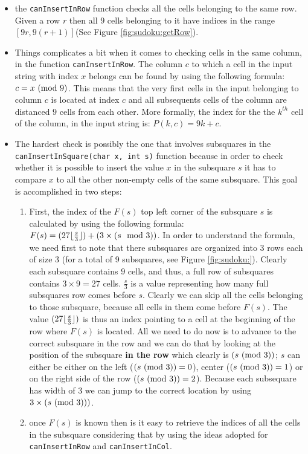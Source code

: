 \begin{itemize}
	\item the \lstinline[columns=fixed]{canInsertInRow} function checks all the cells belonging to
	the same row. Given a row $r$ then all $9$ cells belonging to it have indices in the range
	$[9r,9(r+1)]$(See Figure \ref{fig:sudoku:getRow}).
	\item Things complicates a bit when it comes to checking cells in the same column, in the
	function \lstinline[columns=fixed]{canInsertInRow}. The column $c$ to which a cell in the input
	string with index $x$ belongs can be found by using the following formula: $c = x \ (\mathrm{mod}\ 9)$. This
	means that the very first cells in the input belonging to column $c$ is located at index $c$ and
	all subsequents cells of the column are distanced $9$ cells from each other. More formally, the
	index for the the $k^{th}$ cell of the column, in the input string is: $P(k,c) = 9k+c$.
	\item The hardest check is possibly the one that involves subsquares in the
	\lstinline[columns=fixed]{canInsertInSquare(char x, int s)} function because in order to check
	whether it is possible to insert the value $x$ in the subsquare $s$ it has to compare $x$ to all
	the other non-empty cells of the same subsquare. This goal is accomplished in two steps:
	\begin{enumerate}
		\item First, the index of the $F(s)$ top left corner of the subsquare $s$ is calculated  by
		using the following formula: $F(s) = (27 \lfloor\frac{s}{3}\rfloor) + (3\times (s \mod{3}))$.  In
		order to understand the formula, we need first to note that there subsquares are organized
		into $3$ rows each of size $3$ (for a total of 9 subsquares, see Figure \ref{fig:sudoku:}).
		Clearly each subsquare contains $9$ cells, and thus, a full row of subsquares contains
		$3\times9 =27$ cells. $\frac{s}{3}$ is a value representing how many full subsquares row
		comes before $s$. Clearly we can skip all the cells belonging to those subsquare, because
		all cells in them come before $F(s)$. The value $(27 \lfloor\frac{s}{3}\rfloor)$ is thus an index
		pointing to a cell at the beginning of the row where $F(s)$ is located. All we need to do
		now is to advance to the correct subsquare in the row and we can do that by looking at the
		position of the subsquare \textbf{in the row} which clearly is $(s \ (\mathrm{mod}\ 3))$; $s$ can either
		be either on the left ($(s \ (\mathrm{mod}\ 3))=0$), center ($(s \ (\mathrm{mod}\ 3))=1$) or on the right side of
		the row ($(s \ (\mathrm{mod}\ 3))=2$). Because each subsequare has width of $3$ we can jump to the
		correct location by using $3\times  (s \ (\mathrm{mod}\ 3)))$. 
		\item once $F(s)$ is known then is it easy to retrieve the indices of all the cells in the
		subsquare considering that by using the ideas adopted for
		\lstinline[columns=fixed]{canInsertInRow} and \lstinline[columns=fixed]{canInsertInCol}.
	\end{enumerate}
	
\end{itemize}











